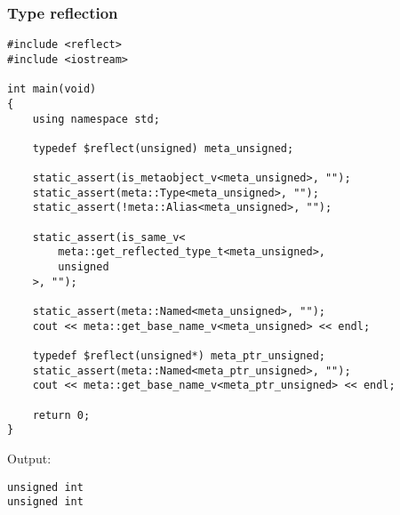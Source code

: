 \subsubsection{Type reflection}

\begin{verbatim}
#include <reflect>
#include <iostream>

int main(void)
{
	using namespace std;

	typedef $reflect(unsigned) meta_unsigned;

	static_assert(is_metaobject_v<meta_unsigned>, "");
	static_assert(meta::Type<meta_unsigned>, "");
	static_assert(!meta::Alias<meta_unsigned>, "");

	static_assert(is_same_v<
		meta::get_reflected_type_t<meta_unsigned>,
		unsigned
	>, "");

	static_assert(meta::Named<meta_unsigned>, "");
	cout << meta::get_base_name_v<meta_unsigned> << endl;

	typedef $reflect(unsigned*) meta_ptr_unsigned;
	static_assert(meta::Named<meta_ptr_unsigned>, "");
	cout << meta::get_base_name_v<meta_ptr_unsigned> << endl;

	return 0;
}
\end{verbatim}

Output:

\begin{verbatim}
unsigned int
unsigned int
\end{verbatim}


